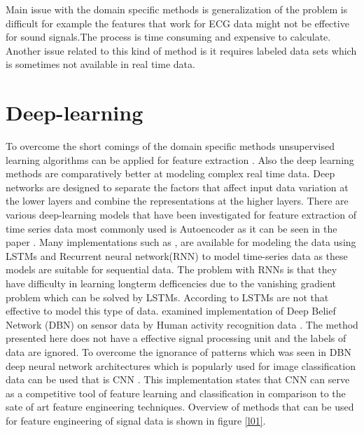   Main issue with the domain specific methods is generalization of the problem is difficult for example the features that work for ECG data might not be effective for sound signals.The process is time consuming and expensive to calculate. Another issue related to this kind of method is it requires labeled data sets which is sometimes not available in real time data.

    
     \section{Deep-learning}
    To overcome the short comings of the domain specific methods unsupervised learning algorithms can be applied for feature extraction \cite{bengio2007scaling}. Also the deep learning methods are comparatively better at modeling complex real time data. Deep networks are designed to separate the factors that affect input data variation at the lower layers and combine the representations at the higher layers. There are various deep-learning models that have been investigated for feature extraction of time series data most commonly used is Autoencoder as it can be seen in the paper \cite{kuznetsov2020electrocardiogram}. Many implementations such as \cite{mehtab2022analysis}, \cite{sagheer2019unsupervised} are available for modeling the data using LSTMs and Recurrent neural network(RNN) to model time-series data as these models are suitable for sequential data. The problem with RNNs is that they have difficulty in learning longterm defficencies due to the vanishing gradient problem \cite{hochreiter2001gradient} which can be solved by LSTMs. According to \cite{langkvist2014review} LSTMs are not that effective to model this type of data.
    \cite{ren2017novel} examined implementation of Deep Belief Network (DBN) on sensor data by Human activity recognition data \cite{vrigkas2015review}. The method presented here does not have a effective signal processing unit and the labels of data are ignored. To overcome the ignorance of patterns which was seen in DBN deep neural network architectures which is popularly used for image classification data can be used that is CNN \cite{yang2015deep}. This implementation states that CNN can serve as a competitive tool of feature learning and classification  in comparison to the sate of art feature engineering techniques.
    Overview of methods that can be used for feature engineering of signal data is shown in figure \ref{l01}.
